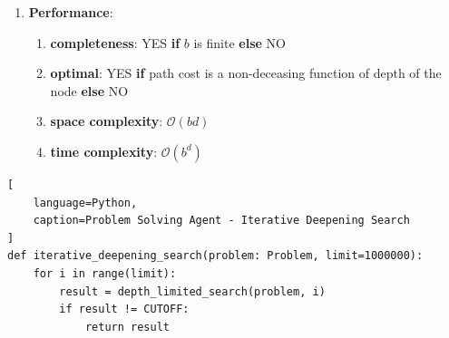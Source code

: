 \begin{enumerate}
    \item \textbf{Performance}:
    \begin{enumerate}
        \item \textbf{completeness}: YES \textbf{if} $b$ is finite \textbf{else} NO
        \hfill \cite{ai/book/Artificial-Intelligence-A-Modern-Approach/Russell-Norvig}

        \item \textbf{optimal}: YES \textbf{if} path cost is a non-deceasing function of depth of the node \textbf{else} NO
        \hfill \cite{ai/book/Artificial-Intelligence-A-Modern-Approach/Russell-Norvig}

        \item \textbf{space complexity}: $\mathcal{O}(b d)$
        \hfill \cite{ai/book/Artificial-Intelligence-A-Modern-Approach/Russell-Norvig}

        \item \textbf{time complexity}: $\mathcal{O}(b^d)$
        \hfill \cite{ai/book/Artificial-Intelligence-A-Modern-Approach/Russell-Norvig}
    \end{enumerate}
\end{enumerate}

\vspace{0.5cm}

\begin{algorithm}[H]
    \caption{The iterative deepening search algorithm, which repeatedly applies depth-limited search with increasing limits. It terminates when a solution is found or if the depth-limited search returns failure, meaning that no solution exists. \cite{ai/book/Artificial-Intelligence-A-Modern-Approach/Russell-Norvig}}

\end{algorithm}


\begin{lstlisting}[
    language=Python,
    caption=Problem Solving Agent - Iterative Deepening Search
]
def iterative_deepening_search(problem: Problem, limit=1000000):
    for i in range(limit):
        result = depth_limited_search(problem, i)
        if result != CUTOFF:
            return result
\end{lstlisting}






